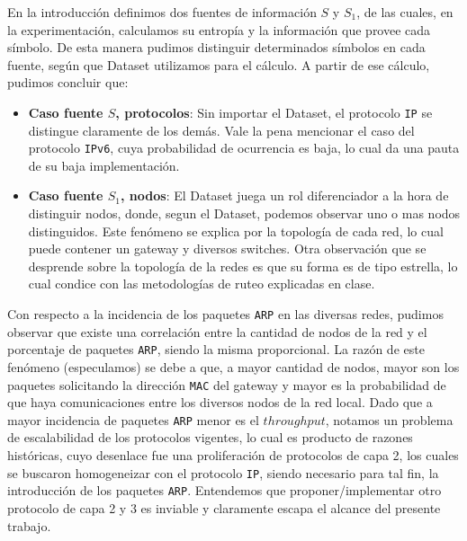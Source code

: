 En la introducción definimos dos fuentes de información $S$ y $S_{1}$, de las cuales, en la experimentación, calculamos su entropía y la información que provee cada símbolo. De esta manera pudimos distinguir determinados símbolos en cada fuente, según que Dataset utilizamos para el cálculo. A partir de ese cálculo, pudimos concluir que:
\begin{itemize}
  \item \textbf{Caso fuente $S$, protocolos}: Sin importar el Dataset, el protocolo \texttt{IP} se distingue claramente de los demás. Vale la pena mencionar el caso del protocolo \texttt{IPv6}, cuya probabilidad de ocurrencia es baja, lo cual da una pauta de su baja implementación.
  \item \textbf{Caso fuente $S_{1}$, nodos}: El Dataset juega un rol diferenciador a la hora de distinguir nodos, donde, segun el Dataset, podemos observar uno o mas nodos distinguidos. Este fenómeno se explica por la topología de cada red, lo cual puede contener un gateway y diversos switches.
  Otra observación que se desprende sobre la topología de la redes es que su forma es de tipo estrella, lo cual condice con las metodologías de ruteo explicadas en clase.
\end{itemize}

Con respecto a la incidencia de los paquetes \texttt{ARP} en las diversas redes, pudimos observar que existe una correlación entre la cantidad de nodos de la red y el porcentaje de paquetes \texttt{ARP}, siendo la misma proporcional. La razón de este fenómeno (especulamos) se debe a que, a mayor cantidad de nodos, mayor son los paquetes solicitando la dirección \texttt{MAC} del gateway y mayor es la probabilidad de que haya comunicaciones entre los diversos nodos de la red local. Dado que a mayor incidencia de paquetes \texttt{ARP} menor es el $throughput$, notamos un problema de escalabilidad de los protocolos vigentes, lo cual es producto de razones históricas, cuyo desenlace fue una proliferación de protocolos de capa 2, los cuales se buscaron homogeneizar con el protocolo \texttt{IP}, siendo necesario para tal fin, la introducción de los paquetes \texttt{ARP}. Entendemos que proponer/implementar otro protocolo de capa 2 y 3 es inviable y claramente escapa el alcance del presente trabajo.
